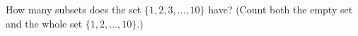 How many subsets does the set $\{1,2,3,\dots,10\}$ have? (Count both the empty set and the whole set $\{1,2,\dots,10\}$.)
